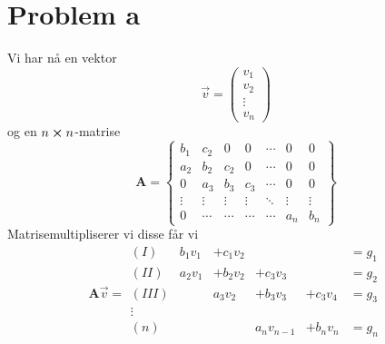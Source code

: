 \documentclass[english,notitlepage]{revtex4-1}  %
\begin{document}
\section*{Problem a}
Vi har nå en vektor
$$
\vec{v}=\begin{pmatrix}
v_1 \\ v_2 \\ \vdots \\ v_n
\end{pmatrix}
$$
og en $n\cross n$-matrise
$$
\textbf{A}=\begin{Bmatrix}
b_1 & c_2 & 0 & 0 & \cdots & 0 &0 \\
a_2 & b_2 & c_2 & 0 & \cdots &0 &0 \\
0 & a_3 & b_3 & c_3 & \cdots & 0 &0 \\
\vdots & \vdots&\vdots&\vdots&\ddots & \vdots & \vdots\\
0& \cdots &  \cdots&\cdots&\cdots& a_n & b_n
\end{Bmatrix}
$$
Matrisemultipliserer vi disse får vi
$$
\textbf{A}\vec{v}=
\begin{matrix}
(I)&b_1 v_1 &+ c_1 v_2 & &&=g_1 \\
(II) &a_2 v_1&+b_2v_2&+c_3 v_3 &&=g_2\\
(III)& & a_3v_2 &+b_3v_3 &+ c_3 v_4 &=g_3\\
\vdots&&&&&\\
(n)&&&a_n v_{n-1}&+b_n v_n&=g_n\\

\end{matrix}
$$

\end{document}
